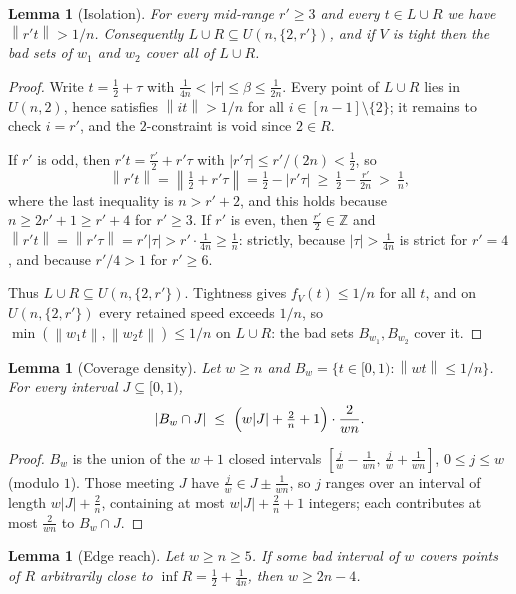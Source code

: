 \documentclass[11pt]{article}
\newtheorem{lemma}[theorem]{Lemma}
\theoremstyle{definition}
\newcommand{\Z}{\mathbb{Z}}
\newcommand{\norm}[1]{\left\lVert #1 \right\rVert}
\begin{document}
\begin{lemma}[Isolation]\label{lem:isolation}
For every mid-range $r'\ge3$ and every $t\in L\cup R$ we have
$\norm{r't}>1/n$.  Consequently $L\cup R\subseteq U(n,\{2,r'\})$, and if
$V$ is tight then the bad sets of $w_1$ and $w_2$ cover all of $L\cup R$.
\end{lemma}

\begin{proof}
Write $t=\tfrac12+\tau$ with $\tfrac1{4n}<|\tau|\le\beta\le\tfrac1{2n}$.
Every point of $L\cup R$ lies in $U(n,2)$, hence satisfies
$\norm{it}>1/n$ for all $i\in[n-1]\setminus\{2\}$; it remains to check
$i=r'$, and the $2$-constraint is void since $2\in R$.

If $r'$ is odd, then $r't=\tfrac{r'}2+r'\tau$ with $|r'\tau|\le
r'/(2n)<\tfrac12$, so
\[
\norm{r't}=\norm{\tfrac12+r'\tau}=\tfrac12-|r'\tau|
\ \ge\ \tfrac12-\tfrac{r'}{2n}\ >\ \tfrac1n,
\]
where the last inequality is $n>r'+2$, and this holds because
$n\ge 2r'+1\ge r'+4$ for $r'\ge3$.  If $r'$ is even, then
$\tfrac{r'}2\in\Z$ and $\norm{r't}=\norm{r'\tau}=r'|\tau|>r'\cdot
\tfrac1{4n}\ge\tfrac1n$: strictly, because $|\tau|>\tfrac1{4n}$ is
strict for $r'=4$, and because $r'/4>1$ for $r'\ge6$.

Thus $L\cup R\subseteq U(n,\{2,r'\})$.  Tightness gives
$f_V(t)\le1/n$ for all $t$, and on $U(n,\{2,r'\})$ every retained speed
exceeds $1/n$, so $\min(\norm{w_1t},\norm{w_2t})\le1/n$ on
$L\cup R$: the bad sets $B_{w_1},B_{w_2}$ cover it.
\end{proof}

\begin{lemma}[Coverage density]\label{lem:density}
Let $w\ge n$ and $B_w=\{t\in[0,1):\norm{wt}\le1/n\}$.  For every interval
$J\subseteq[0,1)$,
\[
|B_w\cap J|\;\le\ \Bigl(w|J|+\tfrac2n+1\Bigr)\cdot\frac{2}{wn}.
\]
\end{lemma}

\begin{proof}
$B_w$ is the union of the $w+1$ closed intervals
$[\frac jw-\frac1{wn},\,\frac jw+\frac1{wn}]$, $0\le j\le w$ (modulo
$1$).  Those meeting $J$ have $\frac jw\in J\pm\frac1{wn}$, so $j$
ranges over an interval of length $w|J|+\frac2n$, containing at most
$w|J|+\frac2n+1$ integers; each contributes at most $\frac{2}{wn}$ to
$B_w\cap J$.
\end{proof}

\begin{lemma}[Edge reach]\label{lem:edgereach}
Let $w\ge n\ge5$.  If some bad interval of $w$ covers points of $R$
arbitrarily close to $\inf R=\tfrac12+\tfrac1{4n}$, then $w\ge2n-4$.
\end{lemma}
\end{document}
